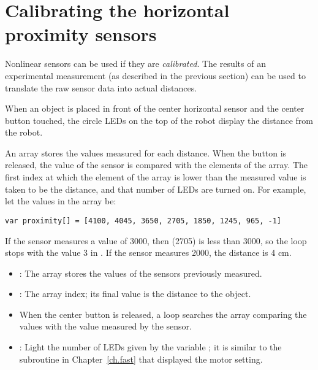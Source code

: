 \section{Calibrating the horizontal proximity sensors}

Nonlinear sensors can be used if they are \emph{calibrated}.
The results of an experimental measurement (as described in the previous
section) can be used to translate the raw sensor data into actual
distances.


When an object is placed in front of the center horizontal sensor and
the center button touched, the circle LEDs on the top of the robot
display the distance from the robot.


An array stores the values measured for each distance. When the button
is released, the value of the sensor is compared with the elements of
the array. The first index at which the element of the array is lower
than the measured value is taken to be the distance, and that number of
LEDs are turned on. For example, let the values in the array be:

\begin{verbatim}
var proximity[] = [4100, 4045, 3650, 2705, 1850, 1245, 965, -1]
\end{verbatim} 

If the sensor measures a value of 3000, then  (2705) is
less than 3000, so the loop stops with the value 3 in .
If the sensor measures 2000, the distance is 4 cm.


\begin{itemize}

\item {}: The array stores the values of the sensors
previously measured.

\item {}: The array index; its final value is the distance to
the object.

\end{itemize}


\begin{itemize}

\item When the center button is released, a loop searches the array
 comparing the values with the value measured by the
sensor.

\item {}: Light the number of LEDs given by the
variable ; it is similar to the subroutine in
Chapter~\ref{ch.fast} that displayed the motor setting.

\end{itemize}

